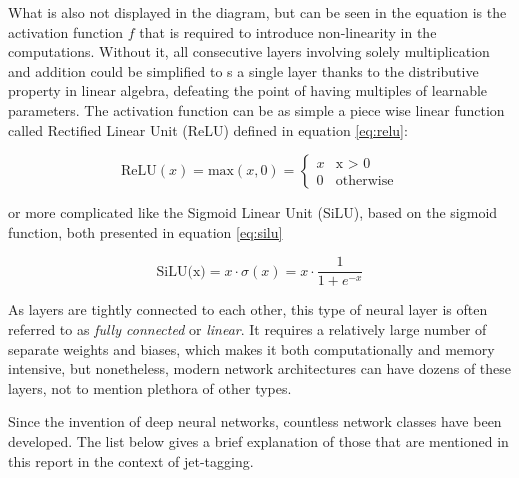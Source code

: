 What is also not displayed in the diagram, but can be seen in the equation is the activation function \(f\) that is required to introduce non-linearity in the computations. Without it, all consecutive layers involving solely multiplication and addition could be simplified to s a single layer thanks to the distributive property in linear algebra, defeating the point of having multiples of learnable parameters. The activation function can be as simple a piece wise linear function called Rectified Linear Unit (ReLU) defined in equation \ref{eq:relu}:

\begin{equation}\label{eq:relu}
  \text{ReLU}(x) = \text{max}(x, 0) = 
  \begin{cases}
    x & \text{x > 0} \\
    0 & \text{otherwise}
  \end{cases}
\end{equation}

or more complicated like the Sigmoid Linear Unit (SiLU), based on the sigmoid function, both presented in equation \ref{eq:silu}

\begin{equation}\label{eq:silu}
  \text{SiLU(x)} = x \cdot \sigma (x) = x \cdot \frac{1}{1 + e^{-x}}
\end{equation}

As layers are tightly connected to each other, this type of neural layer is often referred to as \textit{fully connected} or \textit{linear}. It requires a relatively large number of separate weights and biases, which makes it both computationally and memory intensive, but nonetheless, modern network architectures can have dozens of these layers, not to mention plethora of other types.

Since the invention of deep neural networks, countless network classes have been developed. The list below gives a brief explanation of those that are mentioned in this report in the context of jet-tagging.

